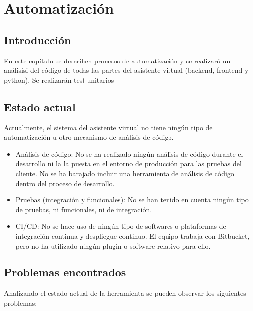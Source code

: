 \chapter{Automatización}
\label{chap:automation}


\section{Introducción}

En este capítulo se describen procesos de automatización y se realizará un análisisi del código de todas las partes del asistente virtual (backend, frontend y python). Se realizarán test unitarios

\section{Estado actual}

Actualmente, el sistema del asistente virtual no tiene ningún tipo de automatización u otro mecanismo de análisis de código. 

\begin{itemize}
    \item Análisis de código: No se ha realizado ningún análisis de código durante el desarrollo ni la la puesta en el entorno de producción para las pruebas del cliente. No se ha barajado incluir una herramienta de análisis de código dentro del proceso de desarrollo.
    \item Pruebas (integración y funcionales): No se han tenido en cuenta ningún tipo de pruebas, ni funcionales, ni de integración.
    \item CI/CD: No se hace uso de ningún tipo de softwares o plataformas de integración continua y despliegue continuo. El equipo trabaja con Bitbucket, pero no ha utilizado ningún plugin o software relativo para ello.
\end{itemize}






\section{Problemas encontrados}

Analizando el estado actual de la herramienta se pueden observar los siguientes problemas:

